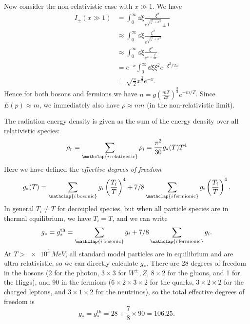 \documentclass{jknotes}
\begin{document}
Now consider the non-relativistic case with \(x\gg1\). We have
\begin{align}
    I_\pm(x\gg1) &= \int_0^\infty\dd{\xi}\frac{\xi^2}{e^{\sqrt{\xi^2+x^2}}\pm1} \\
                 &\approx \int_0^\infty\dd{\xi}\frac{\xi^2}{e^{\sqrt{\xi^2+x^2}}} \\
                 &\approx \int_0^\infty\dd{\xi}\frac{\xi^2}{e^{x + \frac{\xi^2}{2x}}} \\
                 &= e^{-x}\int_0^\infty\dd{\xi}\xi^2e^{-\xi^2/2x} \\
                 &= \sqrt{\frac{\pi}{2}}x^{\frac32}e^{-x}.
\end{align}
Hence for both bosons and fermions we have \(n = g\left(\frac{mT}{2\pi}\right)^{\frac32}e^{-m/T}\). Since \(E(p)\approx m\), we immediately also have \(\rho \approx m n\) (in the non-relativistic limit).

The radiation energy density is given as the sum of the energy density over all relativistic species:
\begin{equation}
    \rho_r = \sum_{\mathclap{i\,\text{relativistic}}}\rho_i = \frac{\pi^2}{30} g_*(T)T^4
\end{equation}
Here we have defined the \emph{effective degrees of freedom}
\begin{equation}
    g_*(T) = \sum_{\mathclap{i\,\text{bosonic}}}g_i\left(\frac{T_i}{T}\right)^4
    + 7/8 \sum_{\mathclap{i\,\text{fermionic}}}g_i\left(\frac{T_i}{T}\right)^4.
\end{equation}
In general \(T_i\ne T\) for decoupled species, but when all particle species are in thermal equilibrium, we have \(T_i=T\), and we can write
\begin{equation}
    g_* = g_*^{\text{th}} = \sum_{\mathclap{i\,\text{bosonic}}}g_i
    + 7/8 \sum_{\mathclap{i\,\text{fermionic}}}g_i.
\end{equation}
At \(T>\SI{e5}{MeV}\), all standard model particles are in equilibrium and are ultra relativistic, so we can directly calculate \(g_*\). There are 28 degrees of freedom in the bosons (2 for the photon, \(3\times3\) for \(W^\pm,Z\), \(8\times2\) for the gluons, and 1 for the Higgs), and 90 in the fermions (\(6\times2\times3\times2\) for the quarks, \(3\times2\times2\) for the charged leptons, and \(3\times1\times2\) for the neutrinos), so the total effective degrees of freedom is
\begin{equation}
    g_* = g_*^{\text{th}} = 28 + \frac78 \times 90 = 106.25.
\end{equation}
\end{document}
